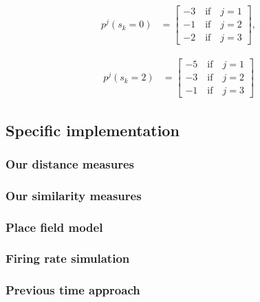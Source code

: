 \begin{Ex}\label{ex1}
 \begin{align*}
    p^{j}(s_k=0) &= \begin{bmatrix}
           -3\quad \text{if} \quad j=1 \\
           -1\quad \text{if} \quad j=2\\
           -2\quad  \text{if} \quad  j=3
         \end{bmatrix},
  \end{align*} 
  
  \quad
  
  \begin{align*}
    p^{j}(s_k=2) &= \begin{bmatrix}
           -5\quad \text{if} \quad j=1 \\
           -3\quad \text{if} \quad j=2\\
           -1\quad  \text{if} \quad  j=3
         \end{bmatrix}
  \end{align*} 
  
\end{Ex}


\subsection{Specific implementation}

\subsubsection{Our distance measures}

\subsubsection{Our similarity measures}

\subsubsection{Place field model}

\subsubsection{Firing rate simulation}

\subsubsection{Previous time approach}

